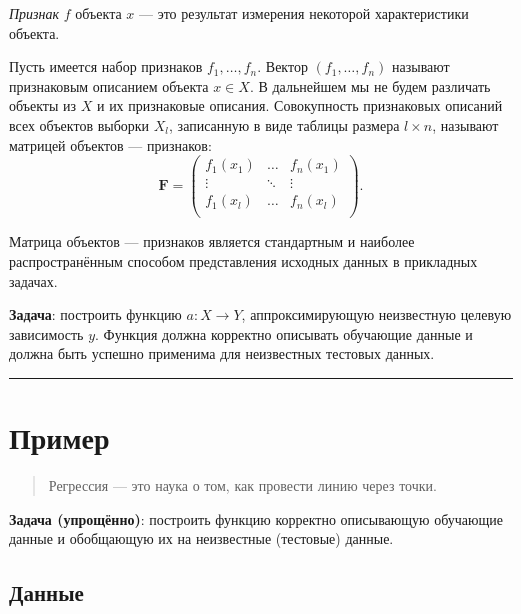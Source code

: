 \documentclass[11pt,a4paper]{article}
\begin{document}
\emph{Признак} \(f\) объекта \(x\) --- это результат измерения некоторой
характеристики объекта.

Пусть имеется набор признаков \(f_1, \ldots, f_n\). Вектор
\((f_1, \ldots, f_n)\) называют признаковым описанием объекта
\(x \in X\). В дальнейшем мы не будем различать объекты из \(X\) и их
признаковые описания. Совокупность признаковых описаний всех объектов
выборки \(X_l\), записанную в виде таблицы размера \(l \times n\),
называют матрицей объектов --- признаков: \[
  \mathbf{F} = 
  \begin{pmatrix}
    f_1(x_1) & \ldots & f_n(x_1) \\
    \vdots   & \ddots & \vdots   \\
    f_1(x_l) & \ldots & f_n(x_l) \\
  \end{pmatrix}.
\]

Матрица объектов --- признаков является стандартным и наиболее
распространённым способом представления исходных данных в прикладных
задачах.

\textbf{Задача}: построить функцию \(a: X \rightarrow Y\),
аппроксимирующую неизвестную целевую зависимость \(y\). Функция должна
корректно описывать обучающие данные и должна быть успешно применима для
неизвестных тестовых данных.

    \begin{center}\rule{0.5\linewidth}{0.5pt}\end{center}

    \hypertarget{ux43fux440ux438ux43cux435ux440}{%
\section{Пример}\label{ux43fux440ux438ux43cux435ux440}}

\begin{quote}
Регрессия --- это наука о том, как провести линию через точки.
\end{quote}

\textbf{Задача (упрощённо)}: построить функцию корректно описывающую
обучающие данные и обобщающую их на неизвестные (тестовые) данные.

    \hypertarget{ux434ux430ux43dux43dux44bux435}{%
\subsection{Данные}\label{ux434ux430ux43dux43dux44bux435}}
\end{document}
